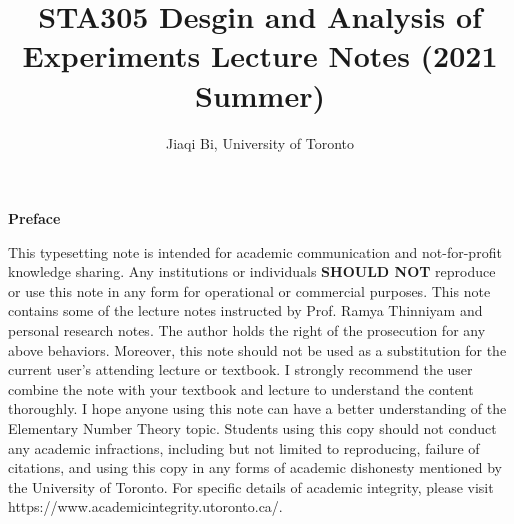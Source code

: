 \documentclass[a4paper,11pt]{article}
\title{\textbf{STA305 Desgin and Analysis of Experiments Lecture Notes (2021 Summer)}}
\author{Jiaqi Bi, University of Toronto}
\begin{document}

\begin{titlepage}
\end{titlepage}

\maketitle

\newpage

\begin{Large}
\noindent \textbf{Preface}
\end{Large}

\vspace{6pt}

\noindent This typesetting note is intended for academic communication and not-for-profit knowledge sharing. Any institutions or individuals \textbf{SHOULD NOT} reproduce or use this note in any form for operational or commercial purposes. This note contains some of the lecture notes instructed by Prof. Ramya Thinniyam and personal research notes. The author holds the right of the prosecution for any above behaviors. Moreover, this note should not be used as a substitution for the current user's attending lecture or textbook. I strongly recommend the user combine the note with your textbook and lecture to understand the content thoroughly. I hope anyone using this note can have a better understanding of the Elementary Number Theory topic. Students using this copy should not conduct any academic infractions, including but not limited to reproducing, failure of citations, and using this copy in any forms of academic dishonesty mentioned by the University of Toronto. For specific details of academic integrity, please visit https://www.academicintegrity.utoronto.ca/. 

\doclicenseThis

\newpage
\end{document}
